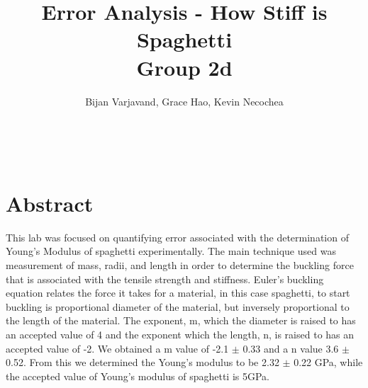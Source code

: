 \documentclass[12pt]{article}
\author{Bijan Varjavand, Grace Hao, Kevin Necochea}
\title{Error Analysis - How Stiff is Spaghetti\\Group 2d}
\renewcommand{\baselinestretch}{1.5}
\begin{document}
\maketitle
\ \\[0.2in]
\renewcommand{\baselinestretch}{1.0}
\section{Abstract}
This lab was focused on quantifying error associated with the determination of Young’s Modulus of spaghetti experimentally. The main technique used was measurement of mass, radii, and length in order to determine the buckling force that is associated with the tensile strength and stiffness. Euler’s buckling equation relates the force it takes for a material, in this case spaghetti, to start buckling is proportional diameter of the material, but inversely proportional to the length of the material.  The exponent, m, which the diameter is raised to has an accepted value of 4 and the exponent which the length, n, is raised to has an accepted value of -2. We obtained a m value of -2.1 $\pm$ 0.33 and a n value 3.6 $\pm$ 0.52. From this we determined the Young’s modulus to be 2.32 $\pm$ 0.22 GPa, while the accepted value of Young’s modulus of spaghetti is 5GPa.  

\clearpage

\linespread{1.6}
\renewcommand{\baselinestretch}{1.5}
\end{document}
